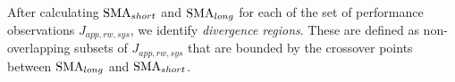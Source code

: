 

After calculating $\textup{SMA}_{short}$ and $\textup{SMA}_{long}$ for each of the set of performance observations $J_{app, rw, sys}$, we identify \emph{divergence regions}. These are defined as non-overlapping subsets of $J_{app, rw, sys}$ that are bounded by the crossover points between $\textup{SMA}_{long}$ and $\textup{SMA}_{short}$.








